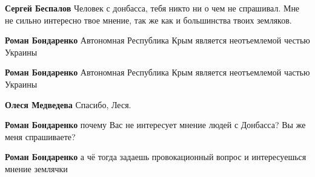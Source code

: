 \begin{itemize}
\begin{itemize}
 
\textbf{Сергей Беспалов} Человек с донбасса, тебя никто ни о чем не спрашивал. Мне не сильно интересно твое мнение, так же как и большинства твоих земляков.

 
\textbf{Роман Бондаренко} Автономная Республика Крым является неотъемлемой честью Украины

 
\textbf{Роман Бондаренко} Автономная Республика Крым является неотъемлемой частью Украины

 
\textbf{Олеся Медведева} Спасибо, Леся.

 
\textbf{Роман Бондаренко} почему Вас не интересует мнение людей с Донбасса? Вы же меня спрашиваете?

 
\textbf{Роман Бондаренко} а чё тогда задаешь провокационный вопрос и интересуешься мнение землячки


\end{itemize}
\end{itemize}
